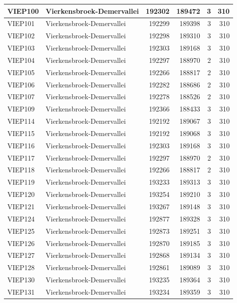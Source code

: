 \documentclass[11pt,]{book}
\begin{document}
\begin{table}
\begin{tabular}[t]{l|l|r|r|r|r}
VIEP100 & Vierkensbroek-Demervallei & 192302 & 189472 & 3 & 310\\
\hline
VIEP101 & Vierkensbroek-Demervallei & 192299 & 189398 & 3 & 310\\
\hline
VIEP102 & Vierkensbroek-Demervallei & 192298 & 189310 & 3 & 310\\
\hline
VIEP103 & Vierkensbroek-Demervallei & 192303 & 189168 & 3 & 310\\
\hline
VIEP104 & Vierkensbroek-Demervallei & 192297 & 188970 & 2 & 310\\
\hline
VIEP105 & Vierkensbroek-Demervallei & 192266 & 188817 & 2 & 310\\
\hline
VIEP106 & Vierkensbroek-Demervallei & 192282 & 188686 & 2 & 310\\
\hline
VIEP107 & Vierkensbroek-Demervallei & 192278 & 188526 & 2 & 310\\
\hline
VIEP109 & Vierkensbroek-Demervallei & 192366 & 188433 & 3 & 310\\
\hline
VIEP114 & Vierkensbroek-Demervallei & 192192 & 189067 & 3 & 310\\
\hline
VIEP115 & Vierkensbroek-Demervallei & 192192 & 189068 & 3 & 310\\
\hline
VIEP116 & Vierkensbroek-Demervallei & 192303 & 189168 & 3 & 310\\
\hline
VIEP117 & Vierkensbroek-Demervallei & 192297 & 188970 & 2 & 310\\
\hline
VIEP118 & Vierkensbroek-Demervallei & 192266 & 188817 & 2 & 310\\
\hline
VIEP119 & Vierkensbroek-Demervallei & 193233 & 189313 & 3 & 310\\
\hline
VIEP120 & Vierkensbroek-Demervallei & 193254 & 189210 & 3 & 310\\
\hline
VIEP121 & Vierkensbroek-Demervallei & 193267 & 189148 & 3 & 310\\
\hline
VIEP124 & Vierkensbroek-Demervallei & 192877 & 189328 & 3 & 310\\
\hline
VIEP125 & Vierkensbroek-Demervallei & 192873 & 189251 & 3 & 310\\
\hline
VIEP126 & Vierkensbroek-Demervallei & 192870 & 189185 & 3 & 310\\
\hline
VIEP127 & Vierkensbroek-Demervallei & 192868 & 189134 & 3 & 310\\
\hline
VIEP128 & Vierkensbroek-Demervallei & 192861 & 189089 & 3 & 310\\
\hline
VIEP130 & Vierkensbroek-Demervallei & 193235 & 189364 & 3 & 310\\
\hline
VIEP131 & Vierkensbroek-Demervallei & 193234 & 189359 & 3 & 310\\

\end{tabular}
\end{table}
\end{document}
